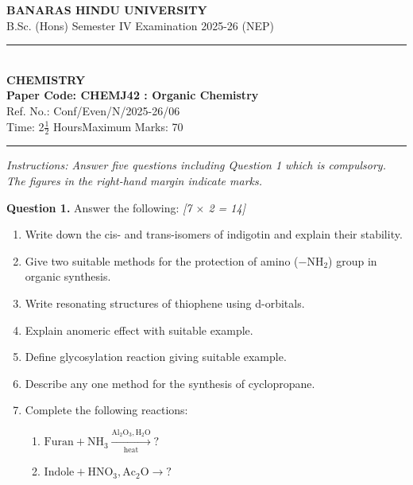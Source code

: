 \documentclass[11pt,a4paper]{article}
\newcommand{\pts}[1]{\hfill \textit{[#1]}}
\begin{document}
\begin{center}
  {\large\bfseries BANARAS HINDU UNIVERSITY}\\[2pt]
  {\normalsize B.Sc. (Hons) Semester IV Examination 2025-26 (NEP)}\\[6pt]
  \rule{0.8\linewidth}{0.5pt}\\[6pt]
  {\large\bfseries CHEMISTRY}\\[4pt]
  {\large\bfseries Paper Code: CHEMJ42 : Organic Chemistry}\\[2pt]
  {\small Ref. No.: Conf/Even/N/2025-26/06}\\[4pt]
  {\normalsize Time: 2$\frac{1}{2}$ Hours\hfill Maximum Marks: 70}
\end{center}

\rule{\linewidth}{0.4pt}

\smallskip

\noindent \textit{Instructions: Answer five questions including Question 1 which is compulsory. The figures in the right-hand margin indicate marks.}

\bigskip

\noindent \textbf{Question 1.} Answer the following: \pts{7 $\times$ 2 = 14}
\begin{enumerate}[label=(\alph*)]
  \item Write down the cis- and trans-isomers of indigotin and explain their stability.
  \item Give two suitable methods for the protection of amino ($-\text{NH}_2$) group in organic synthesis.
  \item Write resonating structures of thiophene using d-orbitals.
  \item Explain anomeric effect with suitable example.
  \item Define glycosylation reaction giving suitable example.
  \item Describe any one method for the synthesis of cyclopropane.
  \item Complete the following reactions:
  \begin{enumerate}[label=(\roman*)]
    \item $\text{Furan} + \text{NH}_3 \xrightarrow[\text{heat}]{\text{Al}_2\text{O}_3, \text{H}_2\text{O}} ?$
    \item $\text{Indole} + \text{HNO}_3, \text{Ac}_2\text{O} \rightarrow ?$
  \end{enumerate}
\end{enumerate}

\bigskip
\end{document}
